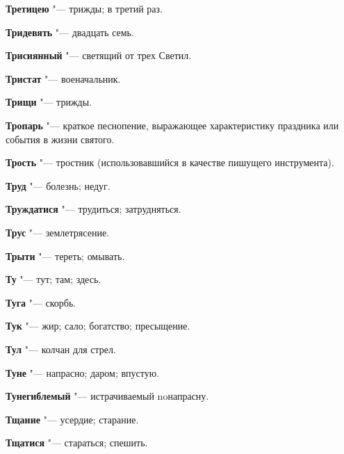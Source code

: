 \begin{mymulticols}{2}
\noindent\textbf{Третицею} "--- трижды; в третий раз. 




\noindent\textbf{Тридевять} "--- двадцать семь. 




\noindent\textbf{Трисиянный} "--- светящий от трех Светил. 




\noindent\textbf{Тристат} "--- военачальник. 




\noindent\textbf{Трищи} "--- трижды. 




\noindent\textbf{Тропарь} "--- краткое песнопение, выражающее характеристику праздника или события в жизни святого. 




\noindent\textbf{Трость} "--- тростник (использовавшийся в качестве пишущего инструмента). 




\noindent\textbf{Труд} "--- болезнь; недуг. 




\noindent\textbf{Труждатися} "--- трудиться; затрудняться. 




\noindent\textbf{Трус} "--- землетрясение. 




\noindent\textbf{Трыти} "--- тереть; омывать. 




\noindent\textbf{Ту} "--- тут; там; здесь. 




\noindent\textbf{Туга} "--- скорбь. 




\noindent\textbf{Тук} "--- жир; сало; богатство; пресыщение. 




\noindent\textbf{Тул} "--- колчан для стрел. 




\noindent\textbf{Туне} "--- напрасно; даром; впустую. 




\noindent\textbf{Тунегиблемый} "--- истрачиваемый noнапрасну. 




\noindent\textbf{Тщание} "--- усердие; старание. 




\noindent\textbf{Тщатися} "--- стараться; спешить. 





\end{mymulticols}
